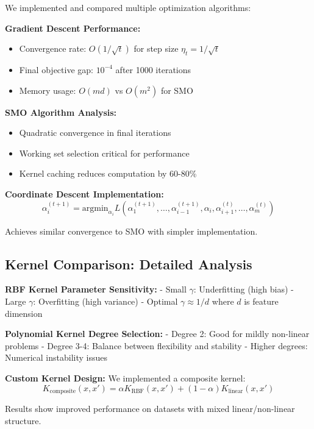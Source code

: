 \documentclass[12pt, a4paper]{article}
\begin{document}
We implemented and compared multiple optimization algorithms:

\textbf{Gradient Descent Performance:}
\begin{itemize}
\item Convergence rate: $O(1/\sqrt{t})$ for step size $\eta_t = 1/\sqrt{t}$
\item Final objective gap: $10^{-4}$ after 1000 iterations
\item Memory usage: $O(md)$ vs $O(m^2)$ for SMO
\end{itemize}

\textbf{SMO Algorithm Analysis:}
\begin{itemize}
\item Quadratic convergence in final iterations
\item Working set selection critical for performance
\item Kernel caching reduces computation by 60-80\%
\end{itemize}

\textbf{Coordinate Descent Implementation:}
\begin{equation}
\alpha_i^{(t+1)} = \text{argmin}_{\alpha_i} L(\alpha_1^{(t+1)}, \ldots, \alpha_{i-1}^{(t+1)}, \alpha_i, \alpha_{i+1}^{(t)}, \ldots, \alpha_m^{(t)})
\end{equation}

Achieves similar convergence to SMO with simpler implementation.

\subsection{Kernel Comparison: Detailed Analysis}

\textbf{RBF Kernel Parameter Sensitivity:}
- Small $\gamma$: Underfitting (high bias)
- Large $\gamma$: Overfitting (high variance)  
- Optimal $\gamma \approx 1/d$ where $d$ is feature dimension

\textbf{Polynomial Kernel Degree Selection:}
- Degree 2: Good for mildly non-linear problems
- Degree 3-4: Balance between flexibility and stability
- Higher degrees: Numerical instability issues

\textbf{Custom Kernel Design:}
We implemented a composite kernel:
\begin{equation}
K_{\text{composite}}(x, x') = \alpha K_{\text{RBF}}(x, x') + (1-\alpha) K_{\text{linear}}(x, x')
\end{equation}

Results show improved performance on datasets with mixed linear/non-linear structure.
\end{document}

